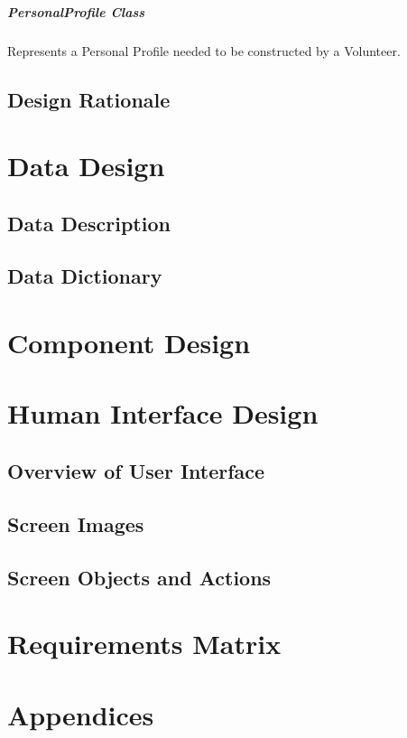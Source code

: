 \documentclass[a4paper,12pt]{report}
\begin{document}
			\paragraph{PersonalProfile Class}
			Represents a Personal Profile needed to be constructed by a Volunteer.
			
		\section{Design Rationale}
	\chapter{Data Design}
		\section{Data Description}
		\section{Data Dictionary}
	\chapter{Component Design}
	\chapter{Human Interface Design}
		\section{Overview of User Interface}
		\section{Screen Images}
		\section{Screen Objects and Actions}
	\chapter{Requirements Matrix}
	\chapter{Appendices}
\end{document}
